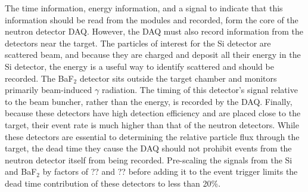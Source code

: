 The time information, energy information, and a signal to indicate that this information should be read from the modules and recorded, form the core of the neutron detector DAQ.  However, the DAQ must also record information from the detectors near the target.  The particles of interest for the Si detector are scattered  beam, and because they are charged and deposit all their energy in the Si detector, the energy is a useful way to identify scattered  and should be recorded.  The BaF$_2$ detector sits outside the target chamber and monitors primarily beam-induced $\gamma$ radiation.  The timing of this detector's signal relative to the beam buncher, rather than the energy, is recorded by the DAQ.  Finally, because these detectors have high detection efficiency and are placed close to the target, their event rate is much higher than that of the neutron detectors.  While these detectors are essential to determining the relative particle flux through the target, the dead time they cause the DAQ should not prohibit events from the neutron detector itself from being recorded.  Pre-scaling the signals from the Si and BaF$_2$ by factors of ?? and ?? before adding it to the event trigger limits the dead time contribution of these detectors to less than 20\%.

